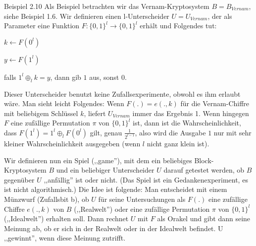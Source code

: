 \documentclass[a4paper]{article}
\begin{document}
\begin{multicols}{3}
    Beispiel 2.10 Als Beispiel betrachten wir das Vernam-Kryptosystem $B=B_{Vernam}$, siehe Beispiel 1.6. Wir definieren einen l-Unterscheider $U=U_{Vernam}$, der als Parameter eine Funktion $F:\{0,1\}^l\rightarrow\{0,1\}^l$ erhält und Folgendes tut:
    \begin{enumerate*}
        \item $k\leftarrow F(0^l)$
        \item  $y\leftarrow F(1^l)$
        \item  falls $1^l\oplus_l k=y$, dann gib $1$ aus, sonst $0$.
    \end{enumerate*}

    Dieser Unterscheider benutzt keine Zufallsexperimente, obwohl es ihm erlaubt wäre. Man sieht leicht Folgendes: Wenn $F(.) =e(.,k)$ für die Vernam-Chiffre mit beliebigem Schlüssel $k$, liefert $U_{Vernam}$ immer das Ergebnis 1. Wenn hingegen $F$ eine zufällige Permutation $\pi$ von $\{0,1\}^l$ ist, dann ist die Wahrscheinlichkeit, dass $F(1^l)=1^l\oplus_l F(0^l)$ gilt, genau $\frac{1}{2^{l-1}}$, also wird die Ausgabe $1$ nur mit sehr kleiner Wahrscheinlichkeit ausgegeben (wenn $l$ nicht ganz klein ist).

    Wir definieren nun ein Spiel (,,game''), mit dem ein beliebiges Block-Kryptosystem $B$ und ein beliebiger Unterscheider $U$ darauf getestet werden, ob $B$ gegenüber $U$ ,,anfällig'' ist oder nicht. (Das Spiel ist ein Gedankenexperiment, es ist nicht algorithmisch.) Die Idee ist folgende: Man entscheidet mit einem Münzwurf (Zufallsbit b), ob $U$ für seine Untersuchungen als $F(.)$ eine zufällige Chiffre $e(.,k)$ von $B$ (,,Realwelt'') oder eine zufällige Permutation $\pi$ von $\{0,1\}^l$ (,,Idealwelt'') erhalten soll. Dann rechnet $U$ mit $F$ als Orakel und gibt dann seine Meinung ab, ob er sich in der Realwelt oder in der Idealwelt befindet. U ,,gewinnt'', wenn diese Meinung zutrifft.


\end{multicols}
\end{document}
